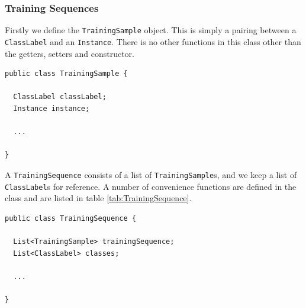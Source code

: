 \documentclass[12pt,twoside,notitlepage]{report}
\begin{document}
            \subsubsection{Training Sequences}
                Firstly we define the \texttt{TrainingSample} object. This is simply a pairing between a 
                \texttt{ClassLabel} and an \texttt{Instance}. There is no other functions in this class other than the 
                getters, setters and constructor.

                \begin{lstlisting}[caption={The \texttt{TrainingSample} declaration.}]
public class TrainingSample {
  
  ClassLabel classLabel;
  Instance instance;

  ...

}
                \end{lstlisting}

                A \texttt{TrainingSequence} consists of a list of \texttt{TrainingSample}s, and we keep a list of 
                \texttt{ClassLabel}s for reference. A number of convenience functions are defined in the class and 
                are listed in table \ref{tab:TrainingSequence}.

                \begin{lstlisting}[caption={The \texttt{TrainingSequence} declaration.}]
public class TrainingSequence {

  List<TrainingSample> trainingSequence;
  List<ClassLabel> classes;

  ...
  
}

                \end{lstlisting}
\end{document}
